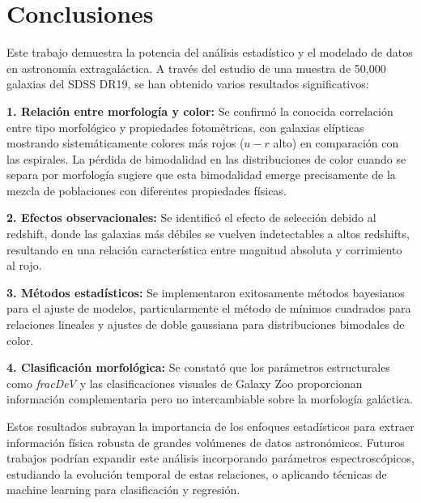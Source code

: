 \documentclass[twocolumn]{article}
\begin{document}
\section{Conclusiones}

Este trabajo demuestra la potencia del análisis estadístico y el modelado de datos en astronomía extragaláctica. A través del estudio de una muestra de 50,000 galaxias del SDSS DR19, se han obtenido varios resultados significativos:

\textbf{1. Relación entre morfología y color:} Se confirmó la conocida correlación entre tipo morfológico y propiedades fotométricas, con galaxias elípticas mostrando sistemáticamente colores más rojos ($u-r$ alto) en comparación con las espirales. La pérdida de bimodalidad en las distribuciones de color cuando se separa por morfología sugiere que esta bimodalidad emerge precisamente de la mezcla de poblaciones con diferentes propiedades físicas.

\textbf{2. Efectos observacionales:} Se identificó el efecto de selección debido al redshift, donde las galaxias más débiles se vuelven indetectables a altos redshifts, resultando en una relación característica entre magnitud absoluta y corrimiento al rojo.

\textbf{3. Métodos estadísticos:} Se implementaron exitosamente métodos bayesianos para el ajuste de modelos, particularmente el método de mínimos cuadrados para relaciones lineales y ajustes de doble gaussiana para distribuciones bimodales de color.

\textbf{4. Clasificación morfológica:} Se constató que los parámetros estructurales como \textit{fracDeV} y las clasificaciones visuales de Galaxy Zoo proporcionan información complementaria pero no intercambiable sobre la morfología galáctica.

Estos resultados subrayan la importancia de los enfoques estadísticos para extraer información física robusta de grandes volúmenes de datos astronómicos. Futuros trabajos podrían expandir este análisis incorporando parámetros espectroscópicos, estudiando la evolución temporal de estas relaciones, o aplicando técnicas de machine learning para clasificación y regresión.



\end{document}
